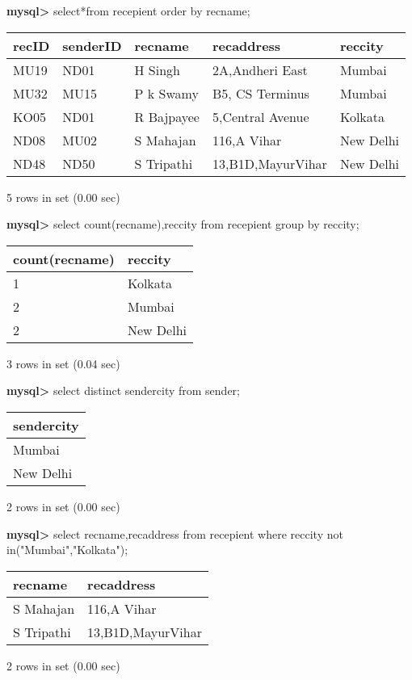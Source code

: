 \documentclass[11pt]{article}
\begin{document}
\textbf{mysql>} select*from recepient order by recname;
\begin{center}
\begin{tabular}{|l|l|l|l|l|}
\hline
recID & senderID & recname & recaddress & reccity \\
\hline
MU19 & ND01 & H Singh & 2A,Andheri East & Mumbai \\
MU32 & MU15 & P k Swamy & B5, CS Terminus & Mumbai \\
KO05 & ND01 & R Bajpayee & 5,Central Avenue & Kolkata \\
ND08 & MU02 & S Mahajan & 116,A Vihar & New Delhi \\
ND48 & ND50 & S Tripathi & 13,B1D,MayurVihar & New Delhi \\
\hline
\end{tabular}
\end{center}
5 rows in set (0.00 sec)

\textbf{mysql>} select count(recname),reccity from recepient group by reccity;
\begin{center}
\begin{tabular}{|l|l|}
\hline
count(recname) & reccity \\
\hline
1 & Kolkata \\
2 & Mumbai \\
2 & New Delhi \\
\hline
\end{tabular}
\end{center}
3 rows in set (0.04 sec)

\textbf{mysql>} select distinct sendercity from sender;
\begin{center}
\begin{tabular}{|l|}
\hline
sendercity \\
\hline
Mumbai \\
New Delhi \\
\hline
\end{tabular}
\end{center}
2 rows in set (0.00 sec)

\textbf{mysql>} select recname,recaddress from recepient where reccity not in("Mumbai","Kolkata");
\begin{center}
\begin{tabular}{|l|l|}
\hline
recname & recaddress \\
\hline
S Mahajan & 116,A Vihar \\
S Tripathi & 13,B1D,MayurVihar \\
\hline
\end{tabular}
\end{center}
2 rows in set (0.00 sec)
\end{document}
